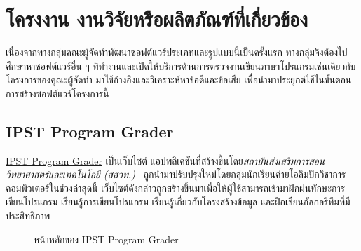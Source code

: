 \documentclass[12pt,one side,openright,a4paper]{cpe-thesis-th}
\newcommand{\thaijustify}[1]{%
  \par\hspace{30pt}\justifying
  #1
}
\begin{document}
\section{โครงงาน งานวิจัยหรือผลิตภัณฑ์ที่เกี่ยวข้อง}
    เนื่องจากทางกลุ่มคณะผู้จัดทำพัฒนาซอฟต์แวร์ประเภทและรูปแบบนี้เป็นครั้งแรก ทางกลุ่มจึงต้องไปศึกษาหาซอฟต์แวร์อื่น ๆ ที่ทำงานและเปิดให้บริการด้านการตรวจงานเขียนภาษาโปรแกรมเช่นเดียวกับโครงการของคุณะผู้จัดทำ มาใช้อ้างอิงและวิเคราะห์หาข้อดีและข้อเสีย เพื่อนำมาประยุกต์ใช้ในขั้นตอนการสร้างซอฟต์แวร์โครงการนี้
    \subsection{IPST Program Grader}
        \thaijustify{
            \href{https://programming.in.th}{IPST Program Grader} เป็นเว็บไซต์ แอปพลิเคชันที่สร้างขึ้นโดย\textit{สถาบันส่งเสริมการสอนวิทยาศาสตร์และเทคโนโลยี (สสวท.)}~\cite{ipstGrader} ถูกนำมาปรับปรุงใหม่โดยกลุ่มนักเรียนค่ายโอลิมปิกวิชาการคอมพิวเตอร์ในช่วงล่าสุดนี้ เว็บไซต์ดังกล่าวถูกสร้างขึ้นมาเพื่อให้ผู้ใช้สามารถเข้ามาฝึกฝนทักษะการเขียนโปรแกรม เรียนรู้การเขียนโปรแกรม เรียนรู้เกี่ยวกับโครงสร้างข้อมูล และฝึกเขียนอัลกอริทึมที่มีประสิทธิภาพ
        }
        \begin{figure}[H]
            \centering
            \caption[หน้าหลักของ IPST Program Grader]{หน้าหลักของ IPST Program Grader}
            \label{fig:ipst-page}
        \end{figure}
\end{document}
